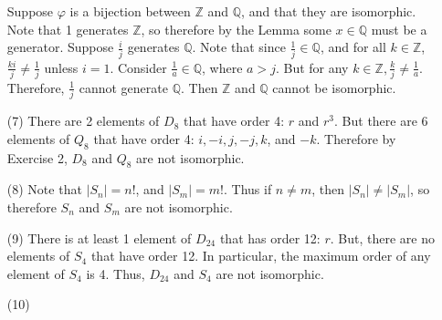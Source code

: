 \documentclass[12pt]{article}
\begin{document}
\begin{itemize}
Suppose $\varphi$ is a bijection between $\mathbb{Z}$ and $\mathbb{Q}$, and that they are isomorphic. Note that 1 generates $\mathbb{Z}$, so therefore by the Lemma some $x \in \mathbb{Q}$ must be a generator. Suppose $\frac{i}{j}$ generates $\mathbb{Q}$. Note that since $\frac{1}{j} \in \mathbb{Q}$, and for all $k \in \mathbb{Z}$, $\frac{ki}{j} \neq \frac{1}{j}$ unless $i = 1$. Consider $\frac{1}{a} \in \mathbb{Q}$, where $a > j$. But for any $k \in \mathbb{Z}, \frac{k}{j} \neq \frac{1}{a}$. Therefore, $\frac{1}{j}$ cannot generate $\mathbb{Q}$. Then $\mathbb{Z}$ and $\mathbb{Q}$ cannot be isomorphic.
\item[(7)]
There are 2 elements of $D_8$ that have order 4: $r$ and $r^3$. But there are 6 elements of $Q_8$ that have order 4: $i, -i, j, -j, k$, and $-k$. Therefore by Exercise 2, $D_8$ and $Q_8$ are not isomorphic.
\item[(8)]
Note that $|S_n| = n!$, and $|S_m| = m!$. Thus if $n \neq m$, then $|S_n| \neq |S_m|$, so therefore $S_n$ and $S_m$ are not isomorphic.
\item[(9)]
There is at least 1 element of $D_{24}$ that has order 12: $r$. But, there are no elements of $S_4$ that have order 12. In particular, the maximum order of any element of $S_4$ is 4. Thus, $D_{24}$ and $S_4$ are not isomorphic.
\item[(10)] 
\end{itemize}
\end{document}
